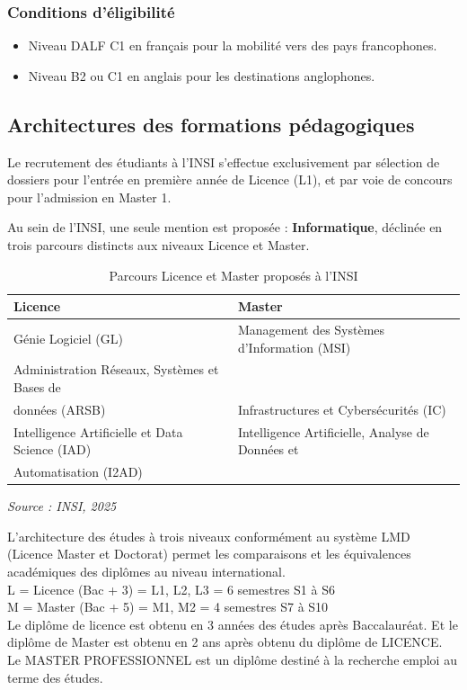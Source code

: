 \documentclass[a4paper,12pt, oneside]{article}
\begin{document}
\subsubsection*{Conditions d’éligibilité}
\begin{itemize}
    \item Niveau DALF C1 en français pour la mobilité vers des pays francophones.
    \item Niveau B2 ou C1 en anglais pour les destinations anglophones.
\end{itemize}

\subsection{Architectures des formations pédagogiques}

Le recrutement des étudiants à l’INSI s’effectue exclusivement par sélection de dossiers pour l’entrée en première année de Licence (L1), et par voie de concours pour l’admission en Master 1.

Au sein de l’INSI, une seule mention est proposée : \textbf{Informatique}, déclinée en trois parcours distincts aux niveaux Licence et Master.


\begin{table}[H]
\centering
\begin{tabular}{|l|l|}
\hline
\textbf{Licence} & \textbf{Master} \\
\hline
Génie Logiciel (GL) & Management des Systèmes d’Information (MSI) \\
\hline
Administration Réseaux, Systèmes et Bases de \\données (ARSB) & Infrastructures et Cybersécurités (IC) \\
\hline
Intelligence Artificielle et Data Science (IAD) & Intelligence Artificielle, Analyse de Données et \\Automatisation (I2AD) \\
\hline
\end{tabular}
\caption{Parcours Licence et Master proposés à l’INSI}
\textit{Source : INSI, 2025}
\label{tab:parcours}
\end{table} 

L’architecture des études à trois niveaux conformément au système LMD (Licence Master et Doctorat) permet les comparaisons et les équivalences académiques des diplômes au niveau international.\\
L = Licence (Bac + 3) = L1, L2, L3 = 6 semestres S1 à S6\\
M = Master (Bac + 5) = M1, M2 = 4 semestres S7 à S10\\
Le diplôme de licence est obtenu en 3 années des études après Baccalauréat. Et le diplôme de Master est obtenu en 2 ans après obtenu du diplôme de LICENCE.\\
Le MASTER PROFESSIONNEL est un diplôme destiné à la recherche emploi au terme des études.\\
\end{document}
